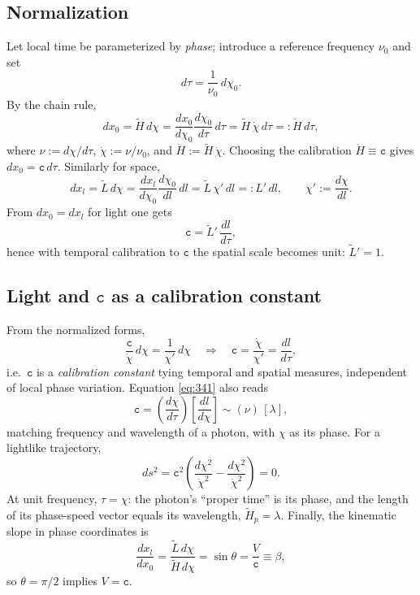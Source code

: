 \documentclass[11pt]{article}
\numberwithin{equation}{section}
\begin{document}
\subsection{Normalization}\label{sec:norm}
Let local time be parameterized by \emph{phase}; introduce a reference frequency $\nu_0$ and set
\begin{equation}
d\tau=\frac{1}{\nu_0}\,d\chi_0.
\label{eq:331}
\end{equation}
By the chain rule,
\begin{equation}
dx_0=\tilde{H}\,d\chi
=\frac{dx_0}{d\chi_0}\frac{d\chi_0}{d\tau}\,d\tau
=\tilde{H}\,\dot{\chi}\,d\tau
=: \dot{H}\,d\tau,
\label{eq:332}
\end{equation}
where $\nu:=d\chi/d\tau$, $\dot{\chi}:=\nu/\nu_0$, and $\dot{H}:=\tilde{H}\,\dot{\chi}$. Choosing the calibration $\dot{H}\equiv \mathtt{c}$ gives $dx_0=\mathtt{c}\,d\tau$. Similarly for space,
\begin{equation}
dx_l=\tilde{L}\,d\chi
=\frac{dx_l}{d\chi_0}\frac{d\chi_0}{dl}\,dl
=\tilde{L}\,\chi'\,dl
=:L'\,dl,\qquad \chi':=\frac{d\chi}{dl}.
\label{eq:333}
\end{equation}
From $dx_0=dx_l$ for light one gets
\begin{equation}
\mathtt{c}=\tilde{L}'\,\frac{dl}{d\tau},
\label{eq:334}
\end{equation}
hence with temporal calibration to $\mathtt{c}$ the spatial scale becomes unit: $\tilde{L}'=1$.

\subsection{\texorpdfstring{Light and $\mathtt{c}$ as a calibration constant}{Light and c as a calibration constant}}
From the normalized forms,
\begin{equation}
\frac{\mathtt{c}}{\dot{\chi}}\,d\chi=\frac{1}{\chi'}\,d\chi
\quad\Rightarrow\quad
\mathtt{c}=\frac{\dot{\chi}}{\chi'}=\frac{dl}{d\tau},
\label{eq:341}
\end{equation}
i.e.\ $\mathtt{c}$ is a \emph{calibration constant} tying temporal and spatial measures, independent of local phase variation. Equation \eqref{eq:341} also reads
\begin{equation}
\mathtt{c}=\left(\frac{d\chi}{d\tau}\right)\!\left[\frac{dl}{d\chi}\right]\sim (\nu)\,[\lambda],
\label{eq:343}
\end{equation}
matching frequency and wavelength of a photon, with $\chi$ as its phase. For a lightlike trajectory,
\begin{equation}
ds^2=\mathtt{c}^2\!\left(\frac{d\chi^2}{\dot{\chi}^2}-\frac{d\chi^2}{\dot{\chi}^2}\right)=0.
\label{eq:344}
\end{equation}
At unit frequency, $\tau=\chi$: the photon's ``proper time'' is its phase, and the length of its phase-speed vector equals its wavelength, $\tilde{H}_p=\lambda$. Finally, the kinematic slope in phase coordinates is
\begin{equation}
\frac{dx_l}{dx_0}
=\frac{\tilde{L}\,d\chi}{\tilde{H}\,d\chi}
=\sin\theta
=\frac{V}{\mathtt{c}}
\equiv \beta,
\label{eq:345}
\end{equation}
so $\theta=\pi/2$ implies $V=\mathtt{c}$.
\end{document}
